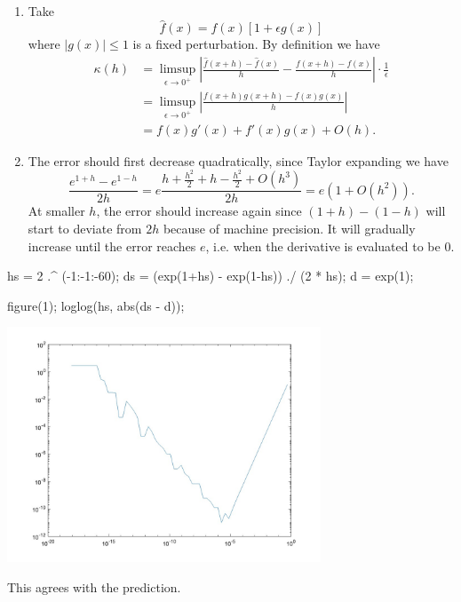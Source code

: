 \documentclass{homework}
\begin{document}
\begin{problem}\(\)\par
\begin{enumerate}[label=(\roman*)]
\item Take \[\hat f(x) = f(x)[1+\epsilon g(x)]\]
where \(|g(x)| \le 1\) is a fixed perturbation.
By definition we have
\[\begin{aligned}
\kappa(h) &= \limsup_{\epsilon \to 0^+}
\left|\frac{\hat f(x+h) - \hat f(x)}{h} - \frac{f(x+h)-f(x)}{h}\right|
\cdot \frac{1}{\epsilon}\\
&= \limsup_{\epsilon \to 0^+}
\left|\frac{f(x+h)g(x+h) - f(x)g(x)}h\right|\\
&= f(x)g'(x) + f'(x)g(x) + O(h).
\end{aligned}\]
\item The error should first decrease
quadratically, since Taylor expanding
we have \[\frac{e^{1 + h} - e^{1-h}}{2h}
= e\frac{h + \frac{h^2}{2} + h - \frac{h^2}{2} + O(h^3)}{2h}
= e(1 + O(h^2)).\]
At smaller \(h\), the error should increase again
since \((1 + h) - (1 - h)\) will start to deviate
from \(2h\) because of machine precision. It will
gradually increase until the error reaches \(e\),
i.e. when the derivative is evaluated to be \(0\).
\end{enumerate}
\begin{matlab}
hs = 2 .^ (-1:-1:-60);
ds = (exp(1+hs) - exp(1-hs)) ./ (2 * hs);
d = exp(1);

figure(1);
loglog(hs, abs(ds - d));
\end{matlab}
\begin{center}
\includegraphics[width=0.7\textwidth]{Hw2-Fig1.jpg}
\end{center}
This agrees with the prediction.
\end{problem}
\end{document}
